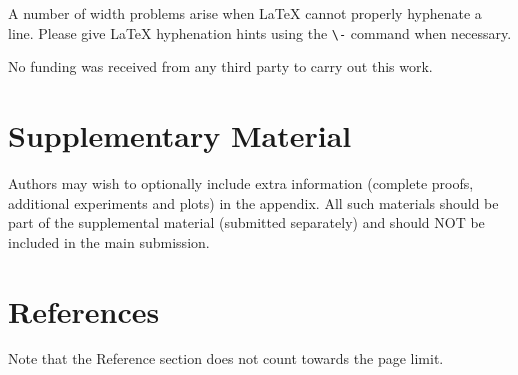 \documentclass{article}
\begin{document}
A number of width problems arise when \LaTeX{} cannot properly hyphenate a
line. Please give LaTeX hyphenation hints using the \verb+\-+ command when
necessary.


\begin{ack}
No funding was received from any third party to carry out this work.
\end{ack}



\section{Supplementary Material}

Authors may wish to optionally include extra information (complete proofs, additional experiments and plots) in the appendix. All such materials should be part of the supplemental material (submitted separately) and should NOT be included in the main submission.


\section*{References}

Note that the Reference section does not count towards the page limit.
\medskip


{
\small



}

\end{document}
